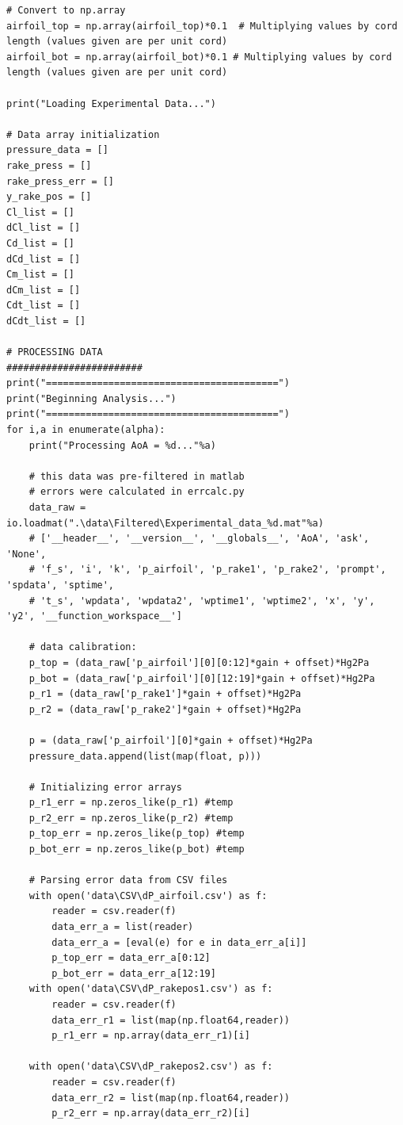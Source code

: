\documentclass[11pt, letterpaper]{article}
\begin{document}
\begin{appendices}
\begin{verbatim}
# Convert to np.array
airfoil_top = np.array(airfoil_top)*0.1  # Multiplying values by cord length (values given are per unit cord)
airfoil_bot = np.array(airfoil_bot)*0.1 # Multiplying values by cord length (values given are per unit cord)

print("Loading Experimental Data...")

# Data array initialization
pressure_data = []
rake_press = []
rake_press_err = []
y_rake_pos = []
Cl_list = []
dCl_list = []
Cd_list = []
dCd_list = []
Cm_list = []
dCm_list = []
Cdt_list = []
dCdt_list = []

# PROCESSING DATA
########################
print("=========================================")
print("Beginning Analysis...")
print("=========================================")
for i,a in enumerate(alpha):
    print("Processing AoA = %d..."%a)

    # this data was pre-filtered in matlab
    # errors were calculated in errcalc.py
    data_raw = io.loadmat(".\data\Filtered\Experimental_data_%d.mat"%a)
    # ['__header__', '__version__', '__globals__', 'AoA', 'ask', 'None', 
    # 'f_s', 'i', 'k', 'p_airfoil', 'p_rake1', 'p_rake2', 'prompt', 'spdata', 'sptime', 
    # 't_s', 'wpdata', 'wpdata2', 'wptime1', 'wptime2', 'x', 'y', 'y2', '__function_workspace__']

    # data calibration:
    p_top = (data_raw['p_airfoil'][0][0:12]*gain + offset)*Hg2Pa
    p_bot = (data_raw['p_airfoil'][0][12:19]*gain + offset)*Hg2Pa
    p_r1 = (data_raw['p_rake1']*gain + offset)*Hg2Pa
    p_r2 = (data_raw['p_rake2']*gain + offset)*Hg2Pa
    
    p = (data_raw['p_airfoil'][0]*gain + offset)*Hg2Pa
    pressure_data.append(list(map(float, p)))
    
    # Initializing error arrays
    p_r1_err = np.zeros_like(p_r1) #temp
    p_r2_err = np.zeros_like(p_r2) #temp
    p_top_err = np.zeros_like(p_top) #temp
    p_bot_err = np.zeros_like(p_bot) #temp
    
    # Parsing error data from CSV files
    with open('data\CSV\dP_airfoil.csv') as f:
        reader = csv.reader(f)
        data_err_a = list(reader)
        data_err_a = [eval(e) for e in data_err_a[i]]
        p_top_err = data_err_a[0:12]
        p_bot_err = data_err_a[12:19]
    with open('data\CSV\dP_rakepos1.csv') as f:
        reader = csv.reader(f)
        data_err_r1 = list(map(np.float64,reader))
        p_r1_err = np.array(data_err_r1)[i]

    with open('data\CSV\dP_rakepos2.csv') as f:
        reader = csv.reader(f)
        data_err_r2 = list(map(np.float64,reader))
        p_r2_err = np.array(data_err_r2)[i]


\end{verbatim}
\end{appendices}
\end{document}
